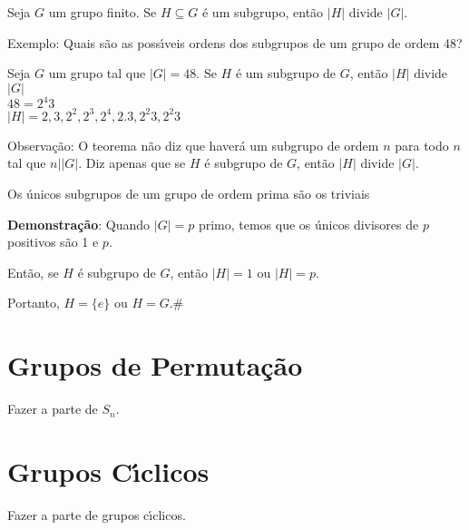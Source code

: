 \begin{teorema}[Lagrange]
Seja $G$ um grupo finito. Se $H\subseteq G$ {\'e} um subgrupo, ent{\~a}o $|H|$ divide $|G|$.
\end{teorema}

Exemplo: Quais s{\~a}o as poss{\'\i}veis ordens dos subgrupos de um grupo de ordem 48?

Seja $G$ um grupo tal que $|G|=48$. Se $H$ {\'e} um subgrupo de $G$, ent{\~a}o $|H|$ divide $|G|$\\
$48=2^{4}3$ \\
$|H|=2,3,2^{2},2^{3},2^{4},2.3,2^{2}3,2^{2}3$

Observa{\c c}{\~a}o: O teorema n{\~a}o diz que haver{\'a} um subgrupo de ordem $n$ para todo $n$ tal que $n||G|$. Diz apenas que se $H$ {\'e} subgrupo de $G$, ent{\~a}o $|H|$ divide $|G|$.

\begin{corolario}
Os {\'u}nicos subgrupos de um grupo de ordem prima s{\~a}o os triviais
\end{corolario}

\textbf{Demonstra{\c c}{\~a}o}: Quando $|G|=p$ primo, temos que os {\'u}nicos divisores de $p$ positivos s{\~a}o 1 e $p$.

Ent{\~a}o, se $H$ {\'e} subgrupo de $G$, ent{\~a}o $|H|=1$ ou $|H|=p$.

Portanto, $H=\{e\}$ ou $H=G$.\#

\section{Grupos de Permuta\c{c}\~ao}
Fazer a parte de $S_n$.

\section{Grupos C{\'\i}clicos}
Fazer a parte de grupos c{\'\i}clicos.
